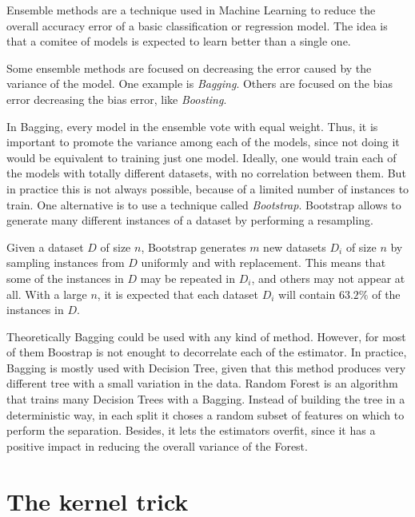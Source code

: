  \begin{pre-delivery}
    Ensemble methods are a technique used in Machine Learning to reduce the
    overall accuracy error of a basic classification or regression model. The
    idea is that a comitee of models is expected to learn better than a single
    one.

    Some ensemble methods are focused on decreasing the error caused by the
    variance of the model. One example is \textit{Bagging}. Others are focused
    on the bias error decreasing the bias error, like \textit{Boosting}.

    In Bagging, every model in the ensemble vote with equal weight. Thus, it is
    important to promote the variance among each of the models, since not doing
    it would be equivalent to training just one model. Ideally, one would train
    each of the models with totally different datasets, with no correlation
    between them. But in practice this is not always possible, because of a
    limited number of instances to train. One alternative is to use a
    technique called \textit{Bootstrap}. Bootstrap allows to generate
    many different instances of a dataset by performing a resampling.

    Given a dataset $D$ of size $n$, Bootstrap generates $m$ new datasets
    $D_i$ of size $n$ by sampling instances from $D$ uniformly and with
    replacement. This means that some of the instances in $D$ may be repeated
    in $D_i$, and others may not appear at all. With a large $n$, it is expected
    that each dataset $D_i$ will contain $63.2 \% $ of the instances in $D$.

    Theoretically Bagging could be used with any kind of method. However, for
    most of them Boostrap is not enought to decorrelate each of the estimator.
    In practice, Bagging is mostly used with Decision Tree, given that this
    method produces very different tree with a small variation in the data.
    Random Forest is an algorithm that trains many Decision Trees with a
    Bagging. Instead of building the tree in a deterministic way, in each
    split it choses a random subset of features on which to perform the
    separation. Besides, it lets the estimators overfit, since it has a positive
    impact in reducing the overall variance of the Forest.
  \end{pre-delivery}

\section{The kernel trick}
\label{sec:kern-trick}




